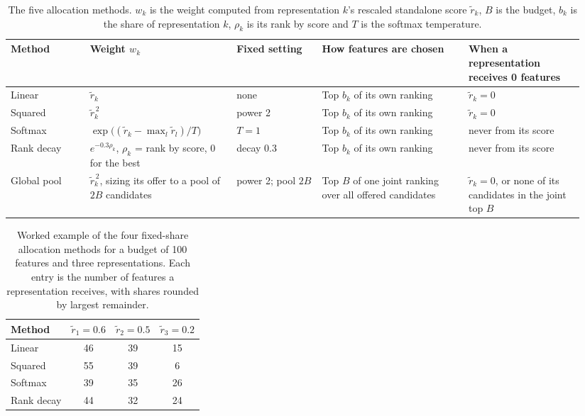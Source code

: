 \begin{table}[htbp]
\centering
\small
\begin{adjustbox}{max width=\textwidth,max totalheight=0.78\textheight}
\begin{tabular}{@{}P{0.13\linewidth}P{0.24\linewidth}P{0.14\linewidth}P{0.24\linewidth}P{0.19\linewidth}@{}}
\toprule
Method & Weight $w_k$ & Fixed setting & How features are chosen & When a representation receives 0 features \\
\midrule
Linear & $\tilde r_k$ & none & Top $b_k$ of its own ranking & $\tilde r_k = 0$ \\
Squared & $\tilde r_k^{\,2}$ & power 2 & Top $b_k$ of its own ranking & $\tilde r_k = 0$ \\
Softmax & $\exp\big((\tilde r_k - \max_l \tilde r_l)/T\big)$ & $T = 1$ & Top $b_k$ of its own ranking & never from its score \\
Rank decay & $e^{-0.3\rho_k}$, $\rho_k$ = rank by score, 0 for the best & decay 0.3 & Top $b_k$ of its own ranking & never from its score \\
Global pool & $\tilde r_k^{\,2}$, sizing its offer to a pool of $2B$ candidates & power 2; pool $2B$ & Top $B$ of one joint ranking over all offered candidates & $\tilde r_k = 0$, or none of its candidates in the joint top $B$ \\
\bottomrule
\end{tabular}
\end{adjustbox}
\caption[The five allocation methods searched.]{The five allocation methods. $w_k$ is the weight computed from representation $k$'s rescaled standalone score $\tilde r_k$, $B$ is the budget, $b_k$ is the share of representation $k$, $\rho_k$ is its rank by score and $T$ is the softmax temperature.}
\label{tab:alloc_methods}
\end{table}

\begin{table}[htbp]
\centering
\begin{adjustbox}{max width=\textwidth,max totalheight=0.78\textheight}
\begin{tabular}{@{}lccc@{}}
\toprule
Method & $\tilde r_1 = 0.6$ & $\tilde r_2 = 0.5$ & $\tilde r_3 = 0.2$ \\
\midrule
Linear & 46 & 39 & 15 \\
Squared & 55 & 39 & 6 \\
Softmax & 39 & 35 & 26 \\
Rank decay & 44 & 32 & 24 \\
\bottomrule
\end{tabular}
\end{adjustbox}
\caption[Worked example of the four fixed-share allocation methods.]{Worked example of the four fixed-share allocation methods for a budget of 100 features and three representations. Each entry is the number of features a representation receives, with shares rounded by largest remainder.}
\label{tab:alloc_example}
\end{table}

